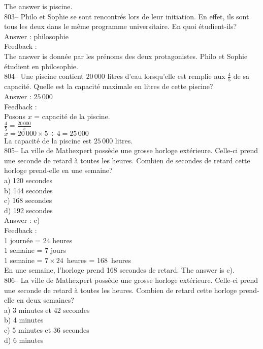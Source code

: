 \documentclass[letterpaper, 12pt]{article}
\begin{document}
The answer is piscine.\\

803-- Philo et Sophie se sont rencontr\'es lors de leur initiation. En
effet, ils sont tous les deux dans le m\^eme programme universitaire.  En
quoi \'etudient-ils?\\

Answer : philosophie\\

Feedback : \\
The answer is donn\'ee par les pr\'enoms des deux protagonistes.  Philo
et Sophie \'etudient en philosophie.\\

804-- Une piscine contient $20\,000$ litres d'eau lorsqu'elle est remplie
aux $\frac{4}{5}$ de sa capacit\'e. Quelle est la capacit\'e maximale en
litres de cette piscine?\\

Answer : $25\,000$\\

Feedback : \\
Posons $x$ = capacit\'e de la piscine.\\
$\frac{4}{5}=\frac{20\,000}{x}$\\
$x=20\,000\times5\div4=25\,000$\\
La capacit\'e de la piscine est $25\,000$ litres.\\

805-- La ville de Mathexpert poss\`ede une grosse horloge ext\'erieure.
Celle-ci prend une seconde de retard \`a toutes les heures.  Combien de
secondes de retard cette horloge prend-elle en une semaine?\\
a) 120 secondes\\
b) 144 secondes\\
c) 168 secondes\\
d) 192 secondes\\

Answer : c)\\

Feedback : \\
1 journ\'ee = 24 heures\\
1 semaine = 7 jours\\
1 semaine = $7\times24$~heures = 168~heures\\
En une semaine, l'horloge prend 168 secondes de retard.  The answer is
c).\\

806-- La ville de Mathexpert poss\`ede une grosse horloge ext\'erieure.
Celle-ci prend une seconde de retard \`a toutes les heures.  Combien de
retard cette horloge prend-elle en deux semaines?\\
a) 3 minutes et 42 secondes\\
b) 4 minutes\\
c) 5 minutes et 36 secondes\\
d) 6 minutes\\
\end{document}
